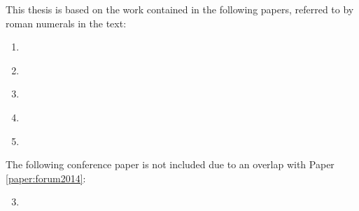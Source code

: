 \begin{refsection}

This thesis is based on the work contained in the following papers,
referred to by roman numerals in the text:
\begin{enumerate}[I]
 \item \label{paper:turbulence}  %
 \item \label{paper:overview}  %
 \item \label{paper:internoise2016}  %
 \item \label{paper:euronoise2015}  %
 \item \label{paper:forum2014}  %
\end{enumerate}
The following conference paper is not included due to an overlap with Paper \ref{paper:forum2014}:
\begin{enumerate}[I]
 \setcounter{enumi}{2}
 \item \label{paper:asa2014}  %
\end{enumerate}

\end{refsection}
